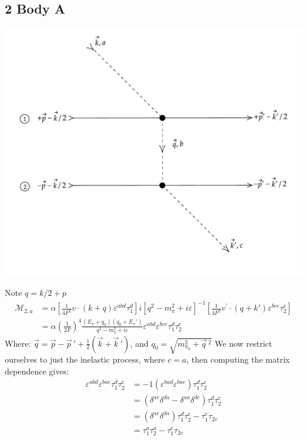 \documentclass[11pt]{article}
\newcommand\ddfrac[2]{\frac{\displaystyle #1}{\displaystyle #2}}
\newcommand\mm{\mathcal{M}}
\newcommand{\mpi}{m_\pi}
\begin{document}
\subsection{2 Body A}
\begin{center}
    \includegraphics[scale=0.7]{2a.pdf}
\end{center}
Note $q=k/2+p$
\begin{align}
    \mm_{2,a}&=\alpha \left[\frac{1}{4 F^2} v \cdot \left( k+q \right) \varepsilon^{abd} \tau_1^d\right] i \left[ q^2-\mpi^2 + i \varepsilon \right]^{-1} \left[ \frac{1}{4 F^2} v^{\prime} \cdot \left( q + k' \right) \varepsilon^{bce} \tau_2^e \right]\\
             &=\alpha\left( \frac{1}{2 F}  \right)^4 
             \ddfrac{(E_\pi + q_0) (q_0+E_\pi')}{q^2 -m_\pi^2+i \varepsilon} \varepsilon^{abd}\varepsilon^{bce}\tau_1^d \tau_2^e
\end{align}
Where:
$\vec{q}=\vec{p} - \vec{p}\,' + \frac{1}{2} \left(\vec{k}+\vec{k}\,' \right)$, and $q_0=\sqrt{m_{\pi_0}^2 + \vec{q}\,^2}$
We now restrict ourselves to just the inelastic process, where $c=a$, then computing the matrix dependence gives:
\begin{align}
    \varepsilon^{abd} \varepsilon^{bae} \tau_1^d \tau_2^e
    &= -1 \left( \varepsilon^{bad} \varepsilon^{bae} \right)\tau_1^d \tau_2^e\\
    &= \left(\delta^{ae} \delta^{da}-\delta^{aa} \delta^{de} \right)\tau_1^d \tau_2^e\\
    &=(\delta^{ae} \delta^{da})\tau_1^d \tau_2^e-\tau_1^e \tau_{2e}\\
    &=\tau_1^a \tau_2^a-\tau_1^e \tau_{2e}
\end{align}
\end{document}
